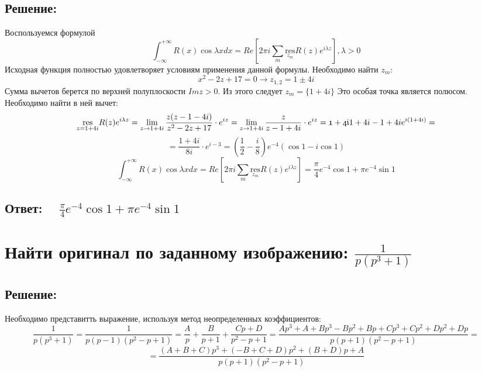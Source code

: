 \documentclass{article}
\begin{document}
        \subsection{Решение:}
        Воспользуемся формулой
        \[
        \int_{-\infty}^{+\infty} R(x)\cos{\lambda}xdx = Re \left[2\pi i\sum\limits_{m} \underset{z_m}{\text{res}}R(z)e^{i\lambda z} \right], \lambda > 0
        \]
        Исходная функция полностью удовлетворяет условиям применения данной формулы. Необходимо найти $z_m$:
        $$x^2 - 2z + 17 = 0 \rightarrow  z_{1,2} = 1  \pm 4i$$
        Сумма вычетов берется по верхней полуплоскости $Im{z} > 0$. Из этого следует $z_m = \{1 + 4i\}$
        Это особая точка является полюсом. Необходимо найти в ней вычет: 
        $$ \underset{z = 1 + 4i}{\text{res}}R(z)e^{i\lambda z} = \lim\limits_{z \rightarrow 1 + 4i} \frac{z(z - 1 - 4i)}{z^2 - 2z + 17} \cdot e^{iz} =  \lim\limits_{z \rightarrow 1 + 4i} \frac{z}{z - 1 + 4i} \cdot  e^{iz} = \frak{1 + 4i}{1 + 4i - 1 + 4i}  e^{i(1 + 4i)} =$$
        $$= \frac{1 + 4i}{8i} \cdot e^{i - 3} = \left(\frac{1}{2} - \frac{i}{8} \right)e^{-4} (\cos{1} - i\cos{1})$$
        \[
        \int_{-\infty}^{+\infty} R(x)\cos{\lambda}xdx = Re \left[2\pi i\sum\limits_{m} \underset{z_m}{\text{res}}R(z)e^{i\lambda z} \right] = \frac{\pi}{4}e^{-4} \cos{1} + \pi e^{-4} \sin{1} 
        \]
        \subsection{Ответ: $\quad \frac{\pi}{4}e^{-4} \cos{1} + \pi e^{-4} \sin{1} $}

        \section{Найти  оригинал по заданному изображению: $\frac{1}{p(p^3 + 1)}$ }
        \subsection{Решение:}
        Необходимо представитть выражение, используя метод неопределенных коэффициентов:
        \[
        \frac{1}{p(p^3 + 1)} = \frac{1}{p(p - 1)(p^2 - p + 1)} = \frac{A}{p} + \frac{B}{p + 1} + \frac{Cp + D}{p^2 - p + 1} = \frac{Ap^3 + A + Bp^3 - Bp^2 + Bp + Cp^3 + Cp^2 + Dp^2 + Dp}{p(p + 1)(p^2 - p + 1)} = 
        \]
        \[
        = \frac{(A + B + C)p^3 + (-B + C + D)p^2 + (B + D)p + A}{p(p + 1)(p^2 - p + 1)}
        \]
        
\end{document}
